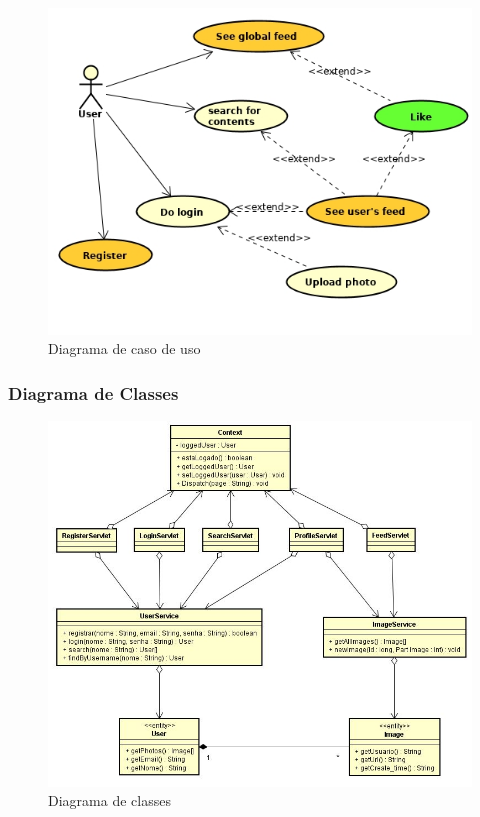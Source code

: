 \begin{figure}[ht]
	\centering
	\includegraphics[width=\textwidth]{./imagens/usecase.jpg}
	\caption{Diagrama de caso de uso}
	\label{fig:casoDeUso}
\end{figure}

\pagebreak

\subsubsection{Diagrama de Classes}
\begin{figure}[ht]
	\centering
	\includegraphics[width=\textwidth]{./imagens/classdiagram.jpg}
	\caption{Diagrama de classes}
	\label{fig:diagramaDeClasse}
\end{figure}


